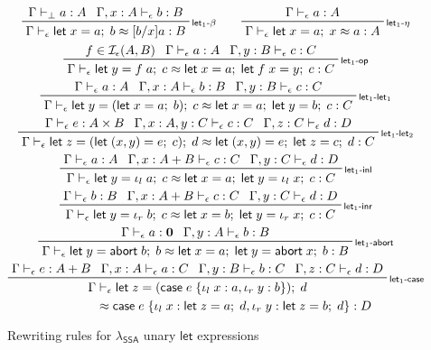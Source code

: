 \documentclass[acmsmall,screen,review]{acmart}
\newcommand{\mc}[1]{\ensuremath{\mathcal{#1}}}
\newcommand{\mb}[1]{\ensuremath{\mathbf{#1}}}
\newcommand{\ms}[1]{\ensuremath{\mathsf{#1}}}
\newcommand{\lto}{:}
\newcommand{\linl}[1]{\iota_l\;{#1}}
\newcommand{\linr}[1]{\iota_r\;{#1}}
\newcommand{\labort}[1]{\ms{abort}\;{#1}}
\newcommand{\letexpr}[3]{\ensuremath{\ms{let}\;#1 = #2;\;#3}}
\newcommand{\caseexpr}[5]{\ms{case}\;#1\;\{\linl{#2} \lto #3, \linr{#4} \lto #5\}}
\newcommand{\bhyp}[2]{#1 : #2}
\newcommand{\rle}[1]{{\scriptsize\textsf{#1}}}
\newcommand{\hasty}[4]{#1 \vdash_{#2} #3: {#4}}
\newcommand{\isop}[4]{#1 \in \mc{I}_{#4}(#2, #3)}
\newcommand{\teqv}{\approx}
\newcommand{\tmeq}[5]{#1 \vdash_{#2} #3 \teqv #4 : {#5}}
\newcommand{\isotopessa}{\(\lambda_{\ms{SSA}}\)}
\begin{document}
\begin{figure}
  \begin{gather*}
    \prftree[r]{\rle{let$_1$-$\beta$}}
      {\hasty{\Gamma}{\bot}{a}{A}}
      {\hasty{\Gamma, \bhyp{x}{A}}{\epsilon}{b}{B}}
      {\tmeq{\Gamma}{\epsilon}{\letexpr{x}{a}{b}}{[b/x]a}{B}}
    \qquad
    \prftree[r]{\rle{let$_1$-$\eta$}}
      {\hasty{\Gamma}{\epsilon}{a}{A}}
      {\tmeq{\Gamma}{\epsilon}{\letexpr{x}{a}{x}}{a}{A}} 
    \\
    \prftree[r]{\rle{let$_1$-op}}
      {\isop{f}{A}{B}{\epsilon}}
      {\hasty{\Gamma}{\epsilon}{a}{A}}
      {\hasty{\Gamma, \bhyp{y}{B}}{\epsilon}{c}{C}}
      {\tmeq{\Gamma}{\epsilon}{\letexpr{y}{f\;a}{c}}{\letexpr{x}{a}{\letexpr{f\;x}{y}{c}}}{C}}
    \\
    \prftree[r]{\rle{let$_1$-let$_1$}}
      {\hasty{\Gamma}{\epsilon}{a}{A}}
      {\hasty{\Gamma, \bhyp{x}{A}}{\epsilon}{b}{B}}
      {\hasty{\Gamma, \bhyp{y}{B}}{\epsilon}{c}{C}}
      {\tmeq{\Gamma}{\epsilon}
        {\letexpr{y}{(\letexpr{x}{a}{b})}{c}}
        {\letexpr{x}{a}{\letexpr{y}{b}{c}}}{C}}
    \\
    \prftree[r]{\rle{let$_1$-let$_2$}}
      {\hasty{\Gamma}{\epsilon}{e}{A \times B}}
      {\hasty{\Gamma, \bhyp{x}{A}, \bhyp{y}{C}}{\epsilon}{c}{C}}
      {\hasty{\Gamma, \bhyp{z}{C}}{\epsilon}{d}{D}}
      {\tmeq{\Gamma}{\epsilon}
        {\letexpr{z}{(\letexpr{(x, y)}{e}{c})}{d}}
        {\letexpr{(x, y)}{e}{\letexpr{z}{c}{d}}}{C}}
    \\
    \prftree[r]{\rle{let$_1$-inl}}
      {\hasty{\Gamma}{\epsilon}{a}{A}}
      {\hasty{\Gamma, \bhyp{x}{A + B}}{\epsilon}{c}{C}}
      {\hasty{\Gamma, \bhyp{y}{C}}{\epsilon}{d}{D}}
      {\tmeq{\Gamma}{\epsilon}{\letexpr{y}{\linl{a}}{c}}{\letexpr{x}{a}{\letexpr{y}{\linl{x}}{c}}}{C}}
    \\
    \prftree[r]{\rle{let$_1$-inr}}
      {\hasty{\Gamma}{\epsilon}{b}{B}}
      {\hasty{\Gamma, \bhyp{x}{A + B}}{\epsilon}{c}{C}}
      {\hasty{\Gamma, \bhyp{y}{C}}{\epsilon}{d}{D}}
      {\tmeq{\Gamma}{\epsilon}{\letexpr{y}{\linr{b}}{c}}{\letexpr{x}{b}{\letexpr{y}{\linr{x}}{c}}}{C}}
    \\
    \prftree[r]{\rle{let$_1$-abort}}
      {\hasty{\Gamma}{\epsilon}{a}{\mb{0}}}
      {\hasty{\Gamma, \bhyp{y}{A}}{\epsilon}{b}{B}}
      {\tmeq{\Gamma}{\epsilon}
        {\letexpr{y}{\labort{b}}{b}}
        {\letexpr{x}{a}{\letexpr{y}{\labort{x}}{b}}}{B}}
    \\
    \prftree[r]{\rle{let$_1$-case}}
      {\hasty{\Gamma}{\epsilon}{e}{A + B}}
      {\hasty{\Gamma, \bhyp{x}{A}}{\epsilon}{a}{C}}
      {\hasty{\Gamma, \bhyp{y}{B}}{\epsilon}{b}{C}}
      {\hasty{\Gamma, \bhyp{z}{C}}{\epsilon}{d}{D}}
      { 
        \prfStackPremises
        {\Gamma \vdash_\epsilon \letexpr{z}{(\caseexpr{e}{x}{a}{y}{b})}{d}}
        {\hspace{6em} \teqv \caseexpr{e}{x}{\letexpr{z}{a}{d}}{y}{\letexpr{z}{b}{d}} : D}
      }
  \end{gather*}
  \Description{}
  \caption{Rewriting rules for \isotopessa{} unary \ms{let} expressions}
  \label{fig:ssa-unary-let-expr}
\end{figure}
\end{document}
